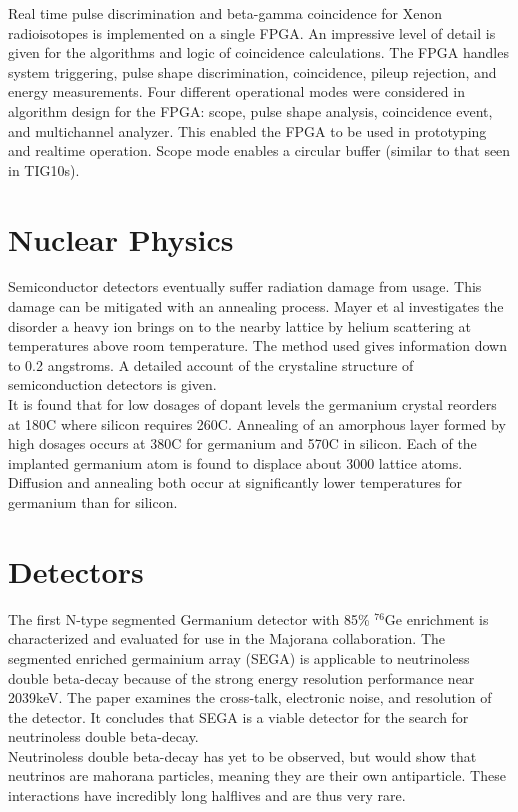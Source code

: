 \documentclass[12pt]{article}
\begin{document}
{\large\textbf{\cite{Farsoni201375}}}
Real time pulse discrimination and beta-gamma coincidence for Xenon radioisotopes is implemented on a single FPGA. An impressive level of detail is given for the algorithms and logic of coincidence calculations. The FPGA handles system triggering, pulse shape discrimination, coincidence, pileup rejection, and energy measurements. Four different operational modes were considered in algorithm design for the FPGA: scope, pulse shape analysis, coincidence event, and multichannel analyzer. This enabled the FPGA to be used in prototyping and realtime operation. Scope mode enables a circular buffer (similar to that seen in TIG10s).
\\[20pt]


\section{Nuclear Physics}   %

{\large\textbf{\cite{Mayer}}}

Semiconductor detectors eventually suffer radiation damage from usage. This damage can be mitigated with an annealing process. Mayer et al investigates the disorder a heavy ion brings on to the nearby lattice by helium scattering at temperatures above room temperature. The method used gives information down to 0.2 angstroms. A detailed account of the crystaline structure of semiconduction detectors is given.
\\
It is found that for low dosages of dopant levels the germanium crystal reorders at 180C where silicon requires 260C. Annealing of an amorphous layer formed by high dosages occurs at 380C for germanium and 570C in silicon. Each of the implanted germanium atom is found to displace about 3000 lattice atoms. Diffusion and annealing both occur at significantly lower temperatures for germanium than for silicon.
\\[20pt]


\section{Detectors}   %

{\large\textbf{\cite{Leviner201466}}}

The first N-type segmented Germanium detector with 85\% $^{76}\mbox{Ge}$ enrichment is characterized and evaluated for use in the Majorana collaboration. The segmented enriched germainium array (SEGA) is applicable to neutrinoless double beta-decay because of the strong energy resolution performance near 2039keV. The paper examines the cross-talk, electronic noise, and resolution of the detector. It concludes that SEGA is a viable detector for the search for neutrinoless double beta-decay.
\\
Neutrinoless double beta-decay has yet to be observed, but would show that neutrinos are mahorana particles, meaning they are their own antiparticle. These interactions have incredibly long halflives and are thus very rare.
\\[20pt]
\end{document}
